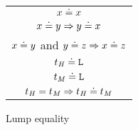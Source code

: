 \begin{figure}[p]
\caption{Lump equality}
\centering
\begin{tabular}{c}

$x \doteq x$ \\
$x \doteq y \Rightarrow y \doteq x$ \\
$x \doteq y$ and $y \doteq z \Rightarrow x \doteq z$ \\
$t_{\mathit{H}} \doteq \mathtt{L}$ \\
$t_{\mathit{M}} \doteq \mathtt{L}$ \\
$t_{\mathit{H}} = t_{\mathit{M}} \Rightarrow t_{\mathit{H}} \doteq t_{\mathit{M}}$ \\

\end{tabular}
\label{figequality}
\end{figure}